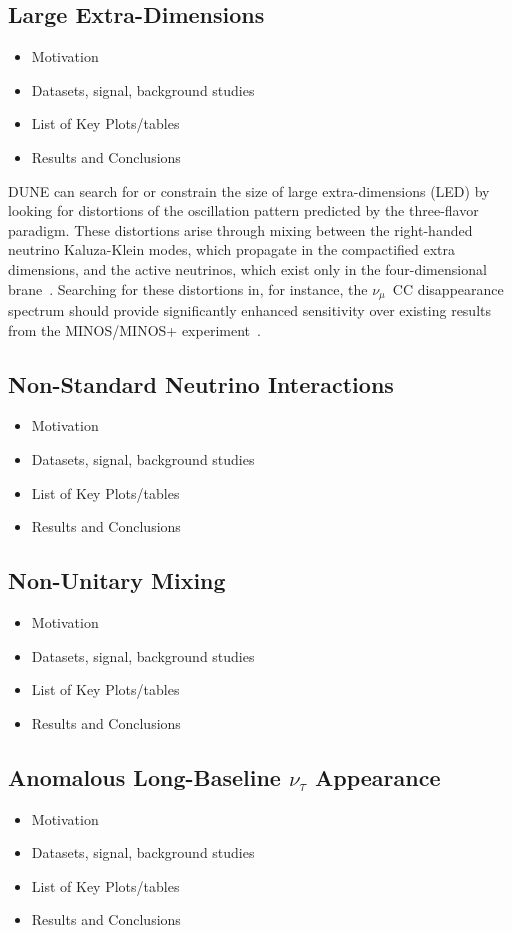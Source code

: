 \subsection{Large Extra-Dimensions}
\begin{itemize}
\item Motivation
\item Datasets, signal, background studies
\item List of Key Plots/tables
\item Results and Conclusions
\end{itemize}
DUNE can search for or constrain the size of large extra-dimensions (LED) by looking for distortions of the oscillation pattern predicted by the three-flavor paradigm. These distortions arise through mixing between the right-handed neutrino Kaluza-Klein modes, which propagate in the compactified extra dimensions, and the active neutrinos, which exist only in the four-dimensional brane~\cite{LEDModel}. Searching for these distortions in, for instance, the $\nu_\mu$~CC disappearance spectrum should provide significantly enhanced sensitivity over existing results from the MINOS/MINOS+ experiment~\cite{MinosplusLED}.


\subsection{Non-Standard Neutrino Interactions}
\begin{itemize}
\item Motivation
\item Datasets, signal, background studies
\item List of Key Plots/tables
\item Results and Conclusions
\end{itemize}

\subsection{Non-Unitary Mixing}
\begin{itemize}
\item Motivation
\item Datasets, signal, background studies
\item List of Key Plots/tables
\item Results and Conclusions
\end{itemize}

\subsection{Anomalous Long-Baseline $\nu_{\tau}$ Appearance }
\begin{itemize}
\item Motivation
\item Datasets, signal, background studies
\item List of Key Plots/tables
\item Results and Conclusions
\end{itemize}

